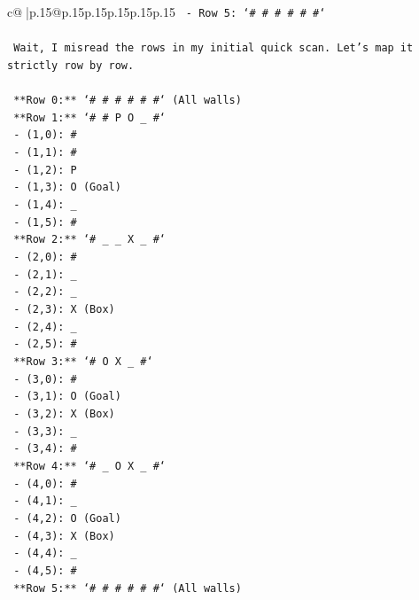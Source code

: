 \documentclass{article}
\begin{document}
{\begin{supertabular}{c@{$\;$}|p{.15\linewidth}@{}p{.15\linewidth}p{.15\linewidth}p{.15\linewidth}p{.15\linewidth}p{.15\linewidth}}
{{{\texttt{        {-} Row 5: `\# \# \# \# \# \#`} \\
\\ 
\texttt{      Wait, I misread the rows in my initial quick scan. Let's map it strictly row by row.} \\
\\ 
\texttt{      **Row 0:** `\# \# \# \# \# \#` (All walls)} \\
\texttt{      **Row 1:** `\# \# P O \_ \#`} \\
\texttt{        {-} (1,0): \#} \\
\texttt{        {-} (1,1): \#} \\
\texttt{        {-} (1,2): P} \\
\texttt{        {-} (1,3): O (Goal)} \\
\texttt{        {-} (1,4): \_} \\
\texttt{        {-} (1,5): \#} \\
\texttt{      **Row 2:** `\# \_ \_ X \_ \#`} \\
\texttt{        {-} (2,0): \#} \\
\texttt{        {-} (2,1): \_} \\
\texttt{        {-} (2,2): \_} \\
\texttt{        {-} (2,3): X (Box)} \\
\texttt{        {-} (2,4): \_} \\
\texttt{        {-} (2,5): \#} \\
\texttt{      **Row 3:** `\# O X \_ \#`} \\
\texttt{        {-} (3,0): \#} \\
\texttt{        {-} (3,1): O (Goal)} \\
\texttt{        {-} (3,2): X (Box)} \\
\texttt{        {-} (3,3): \_} \\
\texttt{        {-} (3,4): \#} \\
\texttt{      **Row 4:** `\# \_ O X \_ \#`} \\
\texttt{        {-} (4,0): \#} \\
\texttt{        {-} (4,1): \_} \\
\texttt{        {-} (4,2): O (Goal)} \\
\texttt{        {-} (4,3): X (Box)} \\
\texttt{        {-} (4,4): \_} \\
\texttt{        {-} (4,5): \#} \\
\texttt{      **Row 5:** `\# \# \# \# \# \#` (All walls)} \\
}}}
\end{supertabular}}
\end{document}
